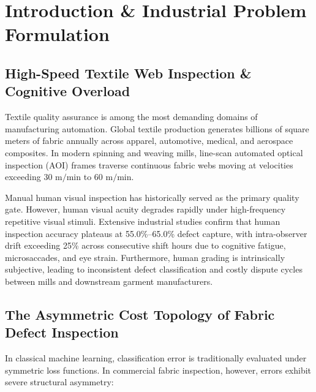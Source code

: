\documentclass[10pt,a4paper]{article}
\begin{document}
\newpage

\tableofcontents
\newpage

\section{Introduction \& Industrial Problem Formulation}

\subsection{High-Speed Textile Web Inspection \& Cognitive Overload}
Textile quality assurance is among the most demanding domains of manufacturing automation. Global textile production generates billions of square meters of fabric annually across apparel, automotive, medical, and aerospace composites. In modern spinning and weaving mills, line-scan automated optical inspection (AOI) frames traverse continuous fabric webs moving at velocities exceeding $30\text{ m/min}$ to $60\text{ m/min}$.

Manual human visual inspection has historically served as the primary quality gate. However, human visual acuity degrades rapidly under high-frequency repetitive visual stimuli. Extensive industrial studies confirm that human inspection accuracy plateaus at 55.0\%--65.0\% defect capture, with intra-observer drift exceeding 25\% across consecutive shift hours due to cognitive fatigue, microsaccades, and eye strain. Furthermore, human grading is intrinsically subjective, leading to inconsistent defect classification and costly dispute cycles between mills and downstream garment manufacturers.

\subsection{The Asymmetric Cost Topology of Fabric Defect Inspection}
In classical machine learning, classification error is traditionally evaluated under symmetric loss functions. In commercial fabric inspection, however, errors exhibit severe structural asymmetry:
\end{document}
